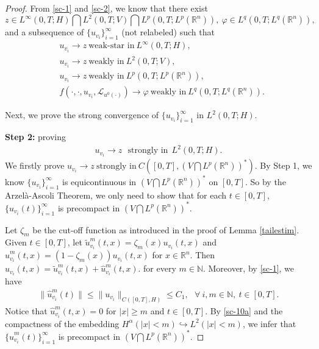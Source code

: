 \documentclass[10pt,a4paper]{amsart}
\def\geq{\geqslant}
\def\leq{\leqslant}
\begin{document}
\begin{proof}
    From \eqref{sc-1} and \eqref{sc-2},
    we   know that there exist
    $$
    z \in L^\infty(0,T; H) \bigcap L^2(0,T; V) \bigcap L^p(0,T; L^p(\mathbb{R}^n) ),\
    \varphi \in L^q(0,T; L^q(\mathbb{R}^n) ),
    $$
    and a  subsequence of $\{ u_{v_i} \}_{i=1}^\infty$ (not relabeled)
    such that
    \begin{align}
        & u_{v_i} \rightarrow z \  \text{weak-star in} \  L^\infty(0,T; H),  \label{uws} \\
        & u_{v_i} \rightarrow z \  \text{weakly in} \  L^2(0,T; V),  \label{uw} \\
        & u_{v_i} \rightarrow z \  \text{weakly in} \  L^p(0,T; L^p(\mathbb{R}^n) ),  \label{uwlp} \\
        & f(\cdot, \cdot, u_{v_i}, \mathcal{L}_{u^0(\cdot)} ) \rightarrow \varphi \  \text{weakly in} \  L^q(0,T; L^q(\mathbb{R}^n) ).  \label{fw}
    \end{align}

    Next, we prove the strong convergence
    of $\{u_{v_i}\}_{i=1}^\infty$ in
    $ L^2(0,T; H)$.

    {\bf Step 2:}  proving
    \begin{align} \label{sc-10}
        u_{v_i} \rightarrow  z  \ \ \  \text{strongly in} \ \  L^2(0,T; H).
    \end{align}
    We  firstly prove
    $u_{v_i} \rightarrow z \
    \text{strongly in} \  C \left([0,T], \left( V \bigcap L^p(\mathbb{R}^n) \right)^\ast \right).$
    By Step 1, we know
    $\{ u_{v_i} \}_{i=1}^\infty$
    is equicontinuous in
    $\left( V \bigcap L^p(\mathbb{R}^n) \right)^\ast$
    on $[0,T]$.
    So by the Arzel\`{a}-Ascoli Theorem,
    we only need to  show that
    for each $t \in [0,T]$,
    $\{ u_{v_i}(t) \}_{i=1}^\infty$
    is precompact in
    $\left( V \bigcap L^p(\mathbb{R}^n) \right)^\ast$.

    Let $\zeta_m$  be the cut-off function
    as introduced in the proof of Lemma
    \ref{tailestim}.
    Given $t \in [0,T]$, let
    $\widetilde{u}_{v_i}^m (t,x)
    = \zeta_m(x) u_{v_i}(t,x)$
    and
    $\widehat{u}_{v_i}^m(t,x)
    = (1 - \zeta_m(x) ) u_{v_i}(t,x)$
    for $x\in \mathbb{R}^n$.
    Then
    $u_{v_i}(t,x)
    = \widetilde{u}_{v_i}^m(t,x)
    + \widehat{u}_{v_i}^m(t,x).$
    for every $m\in \mathbb{N}$.
    Moreover, by \eqref{sc-1}, we have
    \begin{align} \label{sc-10a}
        \| \widehat{u}_{v_i}^m(t) \|
        \leq \| u_{v_i} \|_{C([0,T], H)}
        \leq C_1, \ \ \  \forall\ i,m \in \mathbb{N}, \ t\in [0,T].
    \end{align}
    Notice that
    $\widehat{u}_{v_i}^m(t,x) = 0$  for $|x| \geq m$ and   $t\in [0,T]$.
    By  \eqref{sc-10a} and the
    compactness of the embedding
    $H^\alpha (|x|<m)
    \hookrightarrow L^2(|x|<m)$,
    we infer that
    $\{ \widehat{u}_{v_i}^m(t) \}_{i=1}^\infty$
    is precompact in
    $\left( V \bigcap L^p(\mathbb{R}^n) \right)^\ast$.


\end{proof}
\end{document}
